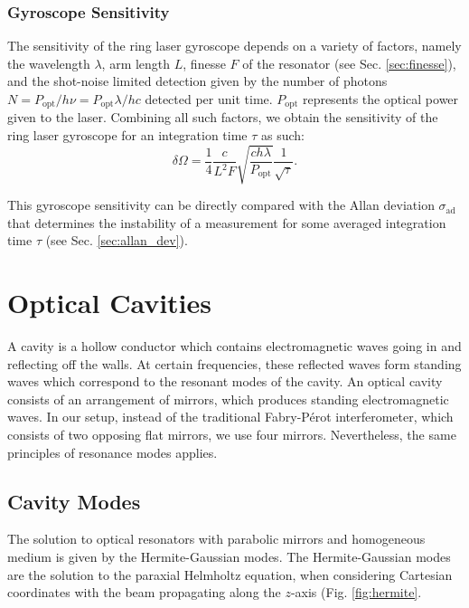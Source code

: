 \documentclass[a4paper]{report}
\numberwithin{equation}{section}
\begin{document}
\subsubsection{Gyroscope Sensitivity}

The sensitivity of the ring laser gyroscope depends on a variety of factors, namely the wavelength $\lambda$, arm length $L$, finesse $F$
of the resonator (see Sec. \ref{sec:finesse}), and the shot-noise limited detection given by the number of photons $N = P_{\text{opt}} / h \nu = P_{\text{opt}} \lambda / hc$ detected per unit time. 
$P_{\text{opt}}$ represents the optical power given to the laser. Combining all such factors, we obtain the sensitivity of the ring laser gyroscope for an integration time $\tau$ as such: 
\begin{equation}
	\delta \Omega = \frac{1}{4} \frac{c}{L^2F}\sqrt{\frac{ch\lambda}{P_{\text{opt}}}} \frac{1}{\sqrt{\tau}}.
	\label{eq:gyroscope_sensitivity}
\end{equation}

This gyroscope sensitivity can be directly compared with the Allan deviation $\sigma_{\text{ad}}$ that determines the instability of 
a measurement for some averaged integration time $\tau$ (see Sec. \ref{sec:allan_dev}). 

\section{Optical Cavities}

A cavity is a hollow conductor which contains electromagnetic waves going in and reflecting off the walls. At certain frequencies, these reflected waves form standing waves which correspond to the resonant modes of the cavity. An optical cavity consists of an arrangement of mirrors, which produces standing electromagnetic waves. In our setup, instead of the traditional Fabry-P\'erot interferometer, which consists of two opposing flat mirrors, we use four mirrors. Nevertheless, the same principles of resonance modes applies.

\subsection{Cavity Modes}

The solution to optical resonators with parabolic mirrors and homogeneous medium is given by the Hermite-Gaussian modes. The Hermite-Gaussian modes are the solution to the paraxial Helmholtz equation, when considering Cartesian coordinates with the beam propagating along the $z$-axis (Fig. \ref{fig:hermite}.
\end{document}
